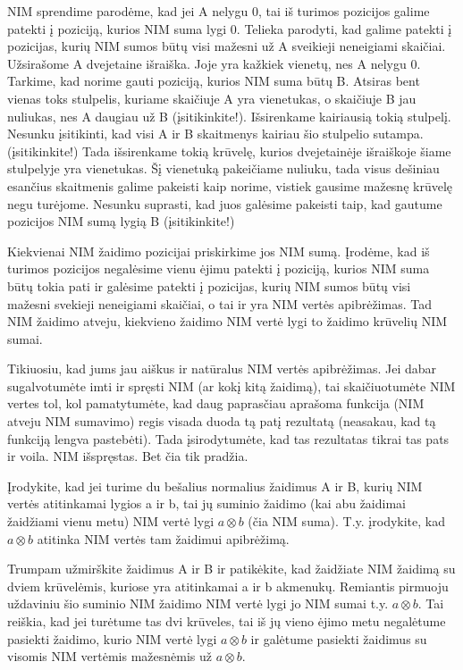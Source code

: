 NIM sprendime parodėme, kad jei A nelygu 0, tai iš turimos pozicijos galime patekti į poziciją, kurios NIM suma lygi 0. Telieka parodyti, kad galime patekti į pozicijas, kurių NIM sumos būtų visi mažesni už A sveikieji neneigiami skaičiai. Užsirašome A dvejetaine išraiška. Joje yra kažkiek vienetų, nes A nelygu 0. Tarkime, kad norime gauti poziciją, kurios NIM suma būtų B. Atsiras bent vienas toks stulpelis, kuriame skaičiuje A yra vienetukas, o skaičiuje B jau nuliukas, nes A daugiau už B (įsitikinkite!). Išsirenkame kairiausią tokią stulpelį. Nesunku įsitikinti, kad visi A ir B skaitmenys kairiau šio stulpelio sutampa. (įsitikinkite!) Tada išsirenkame tokią krūvelę, kurios dvejetainėje išraiškoje šiame stulpelyje yra vienetukas. Šį vienetuką pakeičiame nuliuku, tada visus dešiniau esančius skaitmenis galime pakeisti kaip norime, vistiek gausime mažesnę krūvelę negu turėjome. Nesunku suprasti, kad juos galėsime pakeisti taip, kad gautume pozicijos NIM sumą lygią B (įsitikinkite!) 

Kiekvienai NIM žaidimo pozicijai priskirkime jos NIM sumą. Įrodėme, kad iš turimos pozicijos negalėsime vienu ėjimu patekti į poziciją, kurios NIM suma būtų tokia pati ir galėsime patekti į pozicijas, kurių NIM sumos būtų visi mažesni svekieji neneigiami skaičiai, o tai ir yra NIM vertės apibrėžimas. Tad NIM žaidimo atveju, kiekvieno žaidimo NIM vertė lygi to žaidimo krūvelių NIM sumai.

Tikiuosiu, kad jums jau aiškus ir natūralus NIM vertės apibrėžimas. Jei dabar sugalvotumėte imti ir spręsti NIM (ar kokį kitą žaidimą), tai skaičiuotumėte NIM vertes tol, kol pamatytumėte, kad daug paprasčiau aprašoma funkcija (NIM atveju NIM sumavimo) regis visada duoda tą patį rezultatą (neasakau, kad tą funkciją lengva pastebėti). Tada įsirodytumėte, kad tas rezultatas tikrai tas pats ir voila. NIM išspręstas. Bet čia tik pradžia.

\begin{pavnr} Įrodykite, kad jei turime du bešalius normalius žaidimus A ir B, kurių NIM vertės atitinkamai lygios a ir b, tai jų suminio žaidimo (kai abu žaidimai žaidžiami vienu metu) NIM vertė lygi  $a\otimes b$ (čia NIM suma). T.y. įrodykite, kad  $a\otimes b$ atitinka NIM vertės tam žaidimui apibrėžimą. 
\end{pavnr} 

Trumpam užmirškite žaidimus A ir B ir patikėkite, kad žaidžiate NIM žaidimą su dviem krūvelėmis, kuriose yra atitinkamai a ir b akmenukų. Remiantis pirmuoju uždaviniu šio suminio NIM žaidimo NIM vertė lygi jo NIM sumai t.y.  $a\otimes b$. Tai reiškia, kad jei turėtume tas dvi krūveles, tai iš jų vieno ėjimo metu negalėtume pasiekti žaidimo, kurio NIM vertė lygi  $a\otimes b$ ir galėtume pasiekti žaidimus su visomis NIM vertėmis mažesnėmis už $a\otimes b$. 

